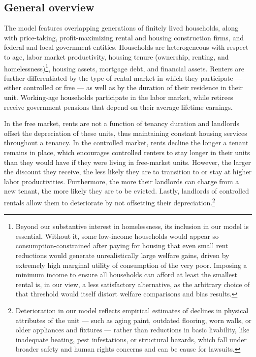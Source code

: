 \documentclass[parskip=full]{article}
\begin{document}
\subsection{General overview}\label{sec:brief_overview}

The model features overlapping generations of finitely lived households, along with price-taking, profit-maximizing rental and housing construction firms, and federal and local government entities. Households are heterogeneous with respect to age, labor market productivity, housing tenure (ownership, renting, and homelessness)\footnote{Beyond our substantive interest in homelessness, its inclusion in our model is essential. Without it, some low-income households would appear so consumption-constrained after paying for housing that even small rent reductions would generate unrealistically large welfare gains, driven by extremely high marginal utility of consumption of the very poor. Imposing a minimum income to ensure all households can afford at least the smallest rental is, in our view, a less satisfactory alternative, as the arbitrary choice of that threshold would itself distort welfare comparisons and bias results.}, housing assets, mortgage debt, and financial assets. Renters are further differentiated by the type of rental market in which they participate — either controlled or free — as well as by the duration of their residence in their unit. Working-age households participate in the labor market, while retirees receive government pensions that depend on their average lifetime earnings.

In the free market, rents are not a function of tenancy duration and landlords offset the depreciation of these units, thus maintaining constant housing services throughout a tenancy. In the controlled market, rents decline the longer a tenant remains in place, which encourages controlled renters to stay longer in their units than they would have if they were living in free-market units. However, the larger the discount they receive, the less likely they are to transition to or stay at higher labor productivities. Furthermore, the more their landlords can charge from a new tenant, the more likely they are to be evicted. Lastly, landlords of controlled rentals allow them to deteriorate by not offsetting their depreciation.\footnote{Deterioration in our model reflects empirical estimates of declines in physical attributes of the unit — such as aging paint, outdated flooring, worn walls, or older appliances and fixtures — rather than reductions in basic livability, like inadequate heating, pest infestations, or structural hazards, which fall under broader safety and human rights concerns and can be cause for lawsuits.}
\end{document}

